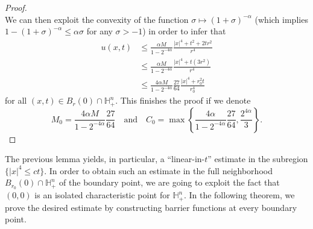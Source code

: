 \documentclass[12pt]{amsart}
\def \H {{\mathbb H}}
\def \a {\alpha}
\begin{document}
\begin{proof}
$$$$
We can then exploit the convexity of the function $\sigma\mapsto (1+\sigma)^{-\alpha}$ (which implies $1-(1+\sigma)^{-\alpha}\leq \alpha\sigma$ for any $\sigma>-1$) in order to infer that
\begin{align*}
u(x,t)&\leq \frac{\alpha M}{1-2^{-4\a}}\frac{|x|^4+t^2+2tr^2}{r^4} \\
&\leq \frac{\alpha M}{1-2^{-4\a}}\frac{|x|^4+t\left(3r^2\right)}{r^4} \\
&\leq \frac{4\alpha M}{1-2^{-4\a}} \frac{27}{64}\frac{|x|^4+r_0^2 t}{r_0^4}
\end{align*}
for all $(x,t)\in B_r(0)\cap \H^n_+$. This finishes the proof if we denote
\[M_0 = \frac{4\alpha M}{1-2^{-4\a}} \frac{27}{64} \quad \text{and} \quad C_0=\max\left\{ \frac{4\alpha}{1-2^{-4\a}} \frac{27}{64}, 
\frac{2^{4\a}}{3}\right\}.\]
\end{proof}

The previous lemma yields, in particular, a ``linear-in-$t$'' estimate in the subregion $\{|x|^4\leq c t\}$. In order to obtain such an estimate in the full neighborhood $B_{r_0}(0)\cap \H^n_+$ of the boundary point, we are going to exploit the fact that $(0,0)$ is an isolated characteristic point for $\H^n_+$. In the following theorem, we prove the desired estimate by constructing barrier functions at every boundary point.
\end{document}
